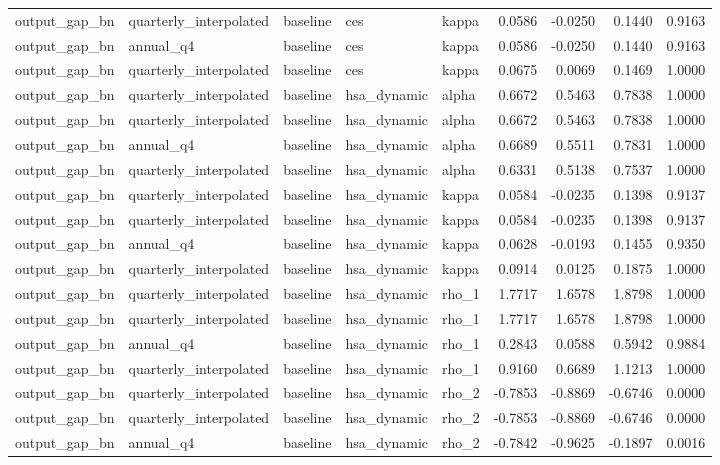 \begin{tabular}{lllllrrrr}
output\_gap\_bn & quarterly\_interpolated & baseline & ces & kappa & 0.0586 & -0.0250 & 0.1440 & 0.9163 \\
output\_gap\_bn & annual\_q4 & baseline & ces & kappa & 0.0586 & -0.0250 & 0.1440 & 0.9163 \\
output\_gap\_bn & quarterly\_interpolated & baseline & ces & kappa & 0.0675 & 0.0069 & 0.1469 & 1.0000 \\
output\_gap\_bn & quarterly\_interpolated & baseline & hsa\_dynamic & alpha & 0.6672 & 0.5463 & 0.7838 & 1.0000 \\
output\_gap\_bn & quarterly\_interpolated & baseline & hsa\_dynamic & alpha & 0.6672 & 0.5463 & 0.7838 & 1.0000 \\
output\_gap\_bn & annual\_q4 & baseline & hsa\_dynamic & alpha & 0.6689 & 0.5511 & 0.7831 & 1.0000 \\
output\_gap\_bn & quarterly\_interpolated & baseline & hsa\_dynamic & alpha & 0.6331 & 0.5138 & 0.7537 & 1.0000 \\
output\_gap\_bn & quarterly\_interpolated & baseline & hsa\_dynamic & kappa & 0.0584 & -0.0235 & 0.1398 & 0.9137 \\
output\_gap\_bn & quarterly\_interpolated & baseline & hsa\_dynamic & kappa & 0.0584 & -0.0235 & 0.1398 & 0.9137 \\
output\_gap\_bn & annual\_q4 & baseline & hsa\_dynamic & kappa & 0.0628 & -0.0193 & 0.1455 & 0.9350 \\
output\_gap\_bn & quarterly\_interpolated & baseline & hsa\_dynamic & kappa & 0.0914 & 0.0125 & 0.1875 & 1.0000 \\
output\_gap\_bn & quarterly\_interpolated & baseline & hsa\_dynamic & rho\_1 & 1.7717 & 1.6578 & 1.8798 & 1.0000 \\
output\_gap\_bn & quarterly\_interpolated & baseline & hsa\_dynamic & rho\_1 & 1.7717 & 1.6578 & 1.8798 & 1.0000 \\
output\_gap\_bn & annual\_q4 & baseline & hsa\_dynamic & rho\_1 & 0.2843 & 0.0588 & 0.5942 & 0.9884 \\
output\_gap\_bn & quarterly\_interpolated & baseline & hsa\_dynamic & rho\_1 & 0.9160 & 0.6689 & 1.1213 & 1.0000 \\
output\_gap\_bn & quarterly\_interpolated & baseline & hsa\_dynamic & rho\_2 & -0.7853 & -0.8869 & -0.6746 & 0.0000 \\
output\_gap\_bn & quarterly\_interpolated & baseline & hsa\_dynamic & rho\_2 & -0.7853 & -0.8869 & -0.6746 & 0.0000 \\
output\_gap\_bn & annual\_q4 & baseline & hsa\_dynamic & rho\_2 & -0.7842 & -0.9625 & -0.1897 & 0.0016 \\

\end{tabular}
